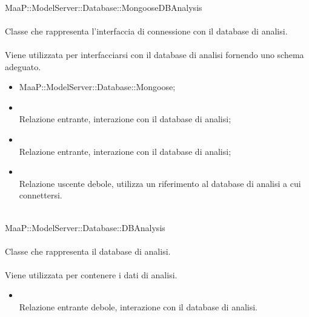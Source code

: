 	\\
	MaaP::ModelServer::Database::MongooseDBAnalysis\\
	\\
	Classe che rappresenta l'interfaccia di connessione con il database di analisi.\\
	\\
	Viene utilizzata per interfacciarsi con il database di analisi fornendo uno schema adeguato.\\
	\begin{itemize}
	\item MaaP::ModelServer::Database::Mongoose;
	\end{itemize}
	\begin{itemize}
	\item{}\\
	Relazione entrante, interazione con il database di analisi;
	\item{}\\
	Relazione entrante, interazione con il database di analisi;
	\item{}\\
	Relazione uscente debole, utilizza un riferimento al database di analisi a cui connettersi.
	\end{itemize}
		
	\\
	MaaP::ModelServer::Database::DBAnalysis\\
	\\
	Classe che rappresenta il database di analisi.\\
	\\
	Viene utilizzata per contenere i dati di analisi.\\
	\begin{itemize}
	\item{}\\
	Relazione entrante debole, interazione con il database di analisi.
	\end{itemize}
		
